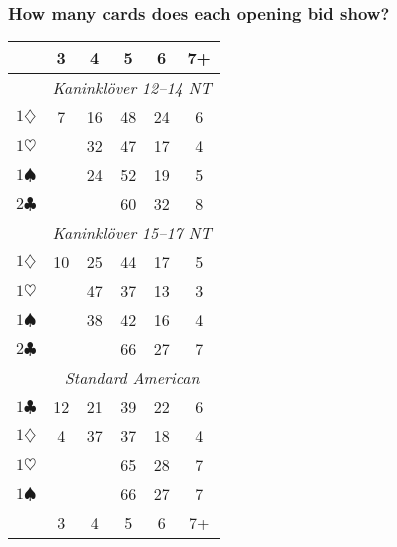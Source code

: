 \documentclass[a4paper, twoside, 11pt]{article}
\begin{document}
\begin{multicols}{3}
\subsubsection*{How many cards does each opening bid show?}
\begin{center}
\begin{tabular}{ |r|ccccc| }
\hline
  & 3 & 4 & 5 & 6 & 7+ \\
 \hline
& \multicolumn{5}{|c|}{\textit{Kaninklöver 12--14 NT}} \\
$1\diamondsuit$ & 7 & 16 & 48 & 24 & 6 \\
$1\heartsuit$ & & 32 & 47 & 17 & 4 \\
 $1\spadesuit$ & & 24 & 52 & 19 & 5 \\
$2\clubsuit$ & & & 60 & 32 & 8 \\
 \hline
 & \multicolumn{5}{|c|}{\textit{Kaninklöver 15--17 NT}} \\
$1\diamondsuit$ & 10 & 25 & 44 & 17 & 5 \\
$1\heartsuit$ & & 47 & 37 & 13 & 3 \\
 $1\spadesuit$ & & 38 & 42 & 16 & 4 \\
$2\clubsuit$ & & & 66 & 27 & 7 \\
 \hline
 & \multicolumn{5}{|c|}{\textit{Standard American}} \\
$1\clubsuit$ & 12 & 21 & 39 & 22 & 6 \\
$1\diamondsuit$ & 4 & 37 & 37 & 18 & 4 \\
$1\heartsuit$ & & & 65 & 28 & 7 \\
$1\spadesuit$ & & & 66 & 27 & 7  \\
\hline
  & 3 & 4 & 5 & 6 & 7+ \\
 \hline
\end{tabular}
\end{center}



\end{multicols}
\end{document}
